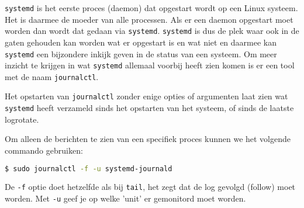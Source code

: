 \texttt{systemd} is het eerste proces (daemon) dat opgestart wordt op een Linux systeem. Het is daarmee de moeder van alle processen. Als er een daemon opgestart moet worden dan wordt dat gedaan via \texttt{systemd}. \texttt{systemd} is dus de plek waar ook in de gaten gehouden kan worden wat er opgestart is en wat niet en daarmee kan \texttt{systemd} een bijzondere inkijk geven in de status van een systeem. Om meer inzicht te krijgen in wat \texttt{systemd} allemaal voorbij heeft zien komen is er een tool met de naam \texttt{journalctl}.

Het opstarten van \texttt{journalctl} zonder enige opties of argumenten laat zien wat \texttt{systemd} heeft verzameld sinds het opstarten van het systeem, of sinds de laatste logrotate.

Om alleen de berichten te zien van een specifiek proces kunnen we het volgende commando gebruiken:
\begin{lstlisting}[language=bash]
$ sudo journalctl -f -u systemd-journald
\end{lstlisting}
De \texttt{-f} optie doet hetzelfde als bij \texttt{tail}, het zegt dat de log gevolgd (follow) moet worden. Met \texttt{-u} geef je op welke 'unit' er gemonitord moet worden.

